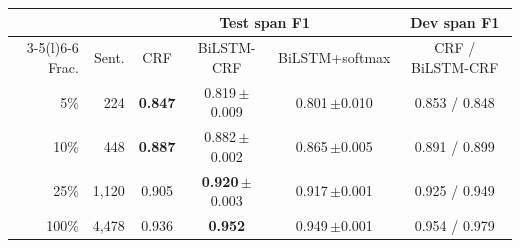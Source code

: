 \begin{tabular}{@{}rr ccc c@{}}
\toprule
 & & \multicolumn{3}{c}{Test span F1} & Dev span F1 \\
\cmidrule(lr){3-5}\cmidrule(l){6-6}
Frac. & Sent. & CRF & BiLSTM-CRF & BiLSTM+softmax & CRF / BiLSTM-CRF \\
\midrule
5\% & 224 & \textbf{0.847} & 0.819\,{\scriptsize$\pm$0.009} & 0.801\,{\scriptsize$\pm$0.010} & 0.853 / 0.848 \\
10\% & 448 & \textbf{0.887} & 0.882\,{\scriptsize$\pm$0.002} & 0.865\,{\scriptsize$\pm$0.005} & 0.891 / 0.899 \\
25\% & 1,120 & 0.905 & \textbf{0.920}\,{\scriptsize$\pm$0.003} & 0.917\,{\scriptsize$\pm$0.001} & 0.925 / 0.949 \\
100\% & 4,478 & 0.936 & \textbf{0.952} & 0.949\,{\scriptsize$\pm$0.001} & 0.954 / 0.979 \\
\bottomrule
\end{tabular}
